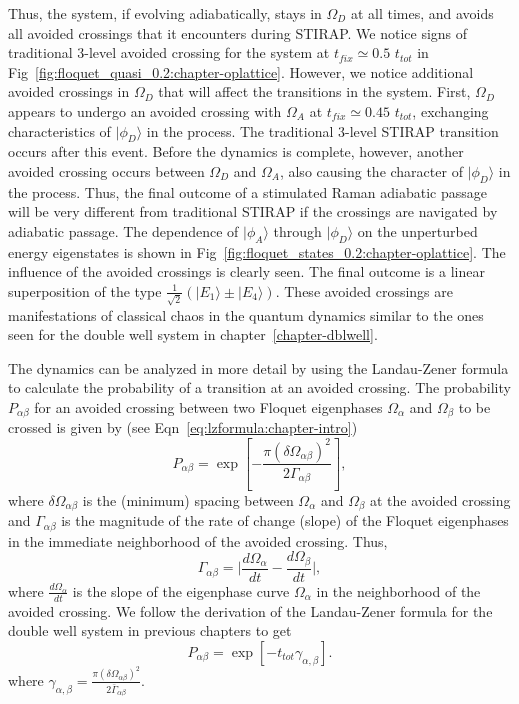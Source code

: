 Thus, the system, if evolving adiabatically, stays in $\Omega_D$ at all times, and avoids all avoided crossings that it encounters during STIRAP. We notice signs of traditional $3$-level avoided crossing for the system at $t_{fix}\simeq 0.5$ $t_{tot}$ in Fig~\ref{fig:floquet_quasi_0.2:chapter-oplattice}. However, we notice additional avoided crossings in $\Omega_D$ that will affect the transitions in the system. First, $\Omega_D$ appears to undergo an avoided crossing with $\Omega_A$ at $t_{fix}\simeq 0.45$ $t_{tot}$, exchanging characteristics of $|\phi_D\rangle$ in the process. The traditional 3-level STIRAP transition occurs after this event. Before the dynamics is complete, however, another avoided crossing occurs between $\Omega_D$ and $\Omega_A$, also causing the character of $|\phi_D\rangle$ in the process. Thus, the final outcome of a stimulated Raman adiabatic passage will be very different from traditional STIRAP if the crossings are navigated by adiabatic passage. The dependence of $|\phi_A\rangle$ through $|\phi_D\rangle$ on the unperturbed energy eigenstates is shown in Fig~\ref{fig:floquet_states_0.2:chapter-oplattice}. The influence of the avoided crossings is clearly seen. The final outcome is a linear superposition of the type $\frac{1}{\sqrt{2}}(|E_1\rangle \pm |E_4\rangle)$. These avoided crossings are manifestations of classical chaos in the quantum dynamics similar to the ones seen for the double well system in chapter~\ref{chapter-dblwell}.
  
The dynamics can be analyzed in more detail by using the Landau-Zener formula to calculate the probability of a transition at an avoided crossing. The probability $P_{\alpha\beta}$ for an avoided crossing between two Floquet eigenphases $\Omega_{\alpha}$ and $\Omega_{\beta}$ to be crossed  is given by (see Eqn~\ref{eq:lzformula:chapter-intro})
\begin{equation}
P_{\alpha \beta}=\exp\left[-\frac{\pi ({\delta \Omega_{\alpha \beta}})^2}{2\Gamma_{\alpha \beta}}\right],
\label{eq:landauzener:chapter-oplattice}
\end{equation}
%
%
where $\delta\Omega_{\alpha\beta}$ is the (minimum) spacing  between $\Omega_\alpha$ and $\Omega_\beta$ at the avoided crossing and $\Gamma_{\alpha\beta}$   is the magnitude of the  rate of change (slope) of the Floquet eigenphases in the immediate neighborhood of the avoided crossing. Thus,
%
\begin{equation}
\Gamma_{\alpha\beta} = {\biggl|} \frac{d\Omega_\alpha}{dt} - \frac{d\Omega_\beta}{dt}{\biggr|},
\label{eq:gamma:chapter-oplattice}
\end{equation}
%
where  $\frac{d\Omega_\alpha}{dt}$ is the slope of the  eigenphase curve $\Omega_\alpha$ in the neighborhood of the avoided crossing. We follow the derivation of the Landau-Zener formula for the double well system in previous chapters to get 
\begin{equation}
P_{\alpha \beta}=\exp\left[-t_{tot}{\gamma}_{\alpha,\beta} \right].
\label{eq:lanzen:chapter-oplattice}
\end{equation}
%
where ${\gamma}_{\alpha,\beta}=\frac{\pi ({\delta \Omega_{\alpha \beta}})^2}{2{\bar \Gamma}_{\alpha \beta}}$. 

